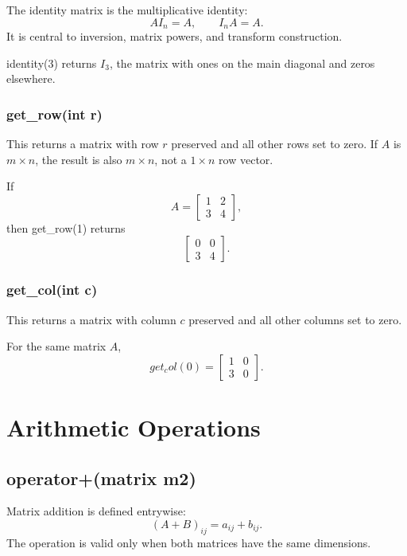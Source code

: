 \documentclass[11pt,a4paper,openany]{book}
\def\code#1{#1}%
\DeclareRobustCommand{\code}[1]{\texttt{\detokenize{#1}}}
\begin{document}
\begin{mathbox}
The identity matrix is the multiplicative identity:
\[
AI_n = A, \qquad I_nA = A.
\]
It is central to inversion, matrix powers, and transform construction.
\end{mathbox}

\begin{examplebox}[Example]
\code{identity(3)} returns \(I_3\), the matrix with ones on the main diagonal and zeros elsewhere.
\end{examplebox}

\subsection{\code{get_row(int r)}}
This returns a matrix with row \(r\) preserved and all other rows set to zero. If \(A\) is \(m \times n\), the result is also \(m \times n\), not a \(1 \times n\) row vector.

\begin{examplebox}[Example]
If
\[
A = \begin{bmatrix}
1 & 2 \\
3 & 4
\end{bmatrix},
\]
then \code{get_row(1)} returns
\[
\begin{bmatrix}
0 & 0 \\
3 & 4
\end{bmatrix}.
\]
\end{examplebox}

\subsection{\code{get_col(int c)}}
This returns a matrix with column \(c\) preserved and all other columns set to zero.

\begin{examplebox}[Example]
For the same matrix \(A\),
\[
\code{get_col(0)} =
\begin{bmatrix}
1 & 0 \\
3 & 0
\end{bmatrix}.
\]
\end{examplebox}

\chapter{Arithmetic Operations}

\section{\code{operator+(matrix m2)}}
Matrix addition is defined entrywise:
\[
(A+B)_{ij} = a_{ij} + b_{ij}.
\]
The operation is valid only when both matrices have the same dimensions.
\end{document}
